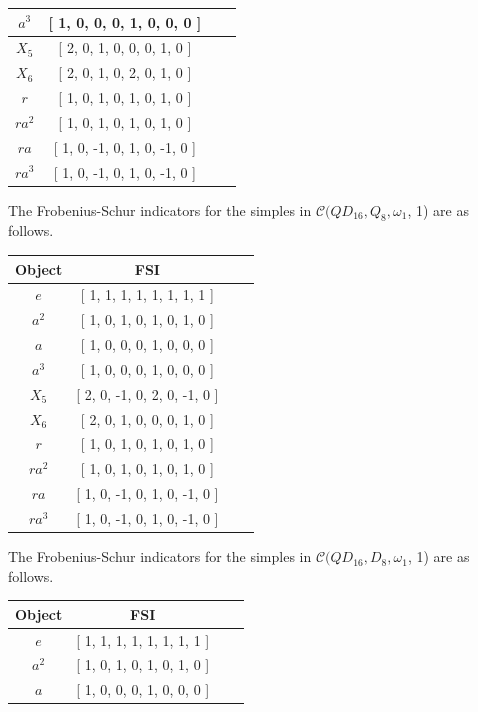 \documentclass[a4paper, 10pt]{book}
\theoremstyle{definition}
\numberwithin{equation}{chapter}
\newcommand\C{\mathcal C}
\begin{document}
\begin{enumerate}
\begin{center}
\begin{tabular}{ | c |c | c | r |}
 $a^3$ &[ 1, 0, 0, 0, 1, 0, 0, 0 ]\\
  \hline
$X_5$&  [ 2, 0, 1, 0, 0, 0, 1, 0 ]\\
  \hline
$ X_6 $&  [ 2, 0, 1, 0, 2, 0, 1, 0 ]\\
  \hline
 $r$& [ 1, 0, 1, 0, 1, 0, 1, 0 ]\\
  \hline
 $ra^2$ & [ 1, 0, 1, 0, 1, 0, 1, 0 ]\\
  \hline
  
 $ra$&  [ 1, 0, -1, 0, 1, 0, -1, 0 ]\\
  \hline

 $ra^3$& [ 1, 0, -1, 0, 1, 0, -1, 0 ]\\
  \hline

   
  \end{tabular}
\end{center}
 The Frobenius-Schur indicators for the simples in $\C(QD_{16}, Q_8, \omega_1$, 1) are as follows.
\begin{center}
\begin{tabular}{ | c |c | c | r |}
\hline
Object & FSI\\
\hline
$e$ &[ 1, 1, 1, 1, 1, 1, 1, 1 ]\\
\hline
 $a^2$&[ 1, 0, 1, 0, 1, 0, 1, 0 ]\\
\hline
 $a$& [ 1, 0, 0, 0, 1, 0, 0, 0 ]\\
  \hline
   
 $a^3$ &[ 1, 0, 0, 0, 1, 0, 0, 0 ]\\
  \hline
$X_5$&  [ 2, 0, -1, 0, 2, 0, -1, 0 ]\\
  \hline
$ X_6 $&  [ 2, 0, 1, 0, 0, 0, 1, 0 ]\\
  \hline
 $r$& [ 1, 0, 1, 0, 1, 0, 1, 0 ]\\
  \hline
 $ra^2$ & [ 1, 0, 1, 0, 1, 0, 1, 0 ]\\
  \hline
  
 $ra$&  [ 1, 0, -1, 0, 1, 0, -1, 0 ]\\
  \hline

 $ra^3$& [ 1, 0, -1, 0, 1, 0, -1, 0 ]\\
  \hline

   
  \end{tabular}
\end{center}
 The Frobenius-Schur indicators for the simples in $\C(QD_{16}, D_8, \omega_1$, 1) are as follows.
\begin{center}
\begin{tabular}{ | c |c | c | r |}
\hline
Object & FSI\\
\hline
$e$ &[ 1, 1, 1, 1, 1, 1, 1, 1 ]\\
\hline
 $a^2$&[ 1, 0, 1, 0, 1, 0, 1, 0 ]\\
\hline
 $a$& [ 1, 0, 0, 0, 1, 0, 0, 0 ]\\
  \hline
   

\end{tabular}
\end{center}
\end{enumerate}
\end{document}
